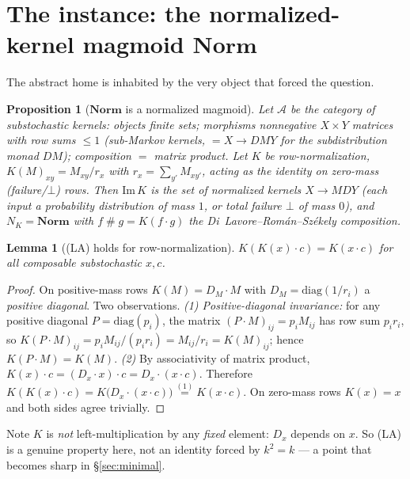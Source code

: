 \documentclass[11pt]{amsart}
\theoremstyle{plain}
\newtheorem{proposition}[theorem]{Proposition}
\newtheorem{lemma}[theorem]{Lemma}
\theoremstyle{definition}
\theoremstyle{remark}
\newcommand{\Norm}{\mathbf{Norm}}
\newcommand{\Img}{\mathrm{Im}\,}
\newcommand{\sh}{\mathbin{\#}}
\newcommand{\LA}{\textsf{(LA)}}
\begin{document}
\section{The instance: the normalized-kernel magmoid \texorpdfstring{$\Norm$}{Norm}}
\label{sec:instance}

The abstract home is inhabited by the very object that forced the question.

\begin{proposition}[$\Norm$ is a normalized magmoid]
\label{prop:norm-instance}
Let $\mathcal{A}$ be the category of \emph{substochastic kernels}: objects finite sets; morphisms
nonnegative $X\times Y$ matrices with row sums $\le 1$ (sub-Markov kernels, $=X\to DMY$ for the
subdistribution monad $DM$); composition $=$ matrix product. Let $K$ be \emph{row-normalization},
$K(M)_{xy}=M_{xy}/r_{x}$ with $r_{x}=\sum_{y'}M_{xy'}$, acting as the identity on zero-mass
(failure/$\bot$) rows. Then $\Img K$ is the set of normalized kernels $X\to MDY$ (each input a
probability distribution of mass $1$, or total failure $\bot$ of mass $0$), and $N_{K}=\Norm$ with
$f\sh g=K(f\cdot g)$ the Di~Lavore--Rom\'an--Sz\'ekely composition.
\end{proposition}

\begin{lemma}[\LA{} holds for row-normalization]
\label{lem:norm-LA}
$K(K(x)\cdot c)=K(x\cdot c)$ for all composable substochastic $x,c$.
\end{lemma}
\begin{proof}
On positive-mass rows $K(M)=D_{M}\cdot M$ with $D_{M}=\mathrm{diag}(1/r_{i})$ a \emph{positive
diagonal}. Two observations. \emph{(1) Positive-diagonal invariance:} for any positive diagonal
$P=\mathrm{diag}(p_{i})$, the matrix $(P\cdot M)_{ij}=p_{i}M_{ij}$ has row sum $p_{i}r_{i}$, so
$K(P\cdot M)_{ij}=p_{i}M_{ij}/(p_{i}r_{i})=M_{ij}/r_{i}=K(M)_{ij}$; hence $K(P\cdot M)=K(M)$. \emph{(2)}
By associativity of matrix product, $K(x)\cdot c=(D_{x}\cdot x)\cdot c=D_{x}\cdot(x\cdot c)$.
Therefore $K(K(x)\cdot c)=K\big(D_{x}\cdot(x\cdot c)\big)\overset{(1)}{=}K(x\cdot c)$. On zero-mass
rows $K(x)=x$ and both sides agree trivially.
\end{proof}

Note $K$ is \emph{not} left-multiplication by any \emph{fixed} element: $D_{x}$ depends on $x$. So
\LA{} is a genuine property here, not an identity forced by $k^{2}=k$ --- a point that becomes sharp
in \S\ref{sec:minimal}.
\end{document}
